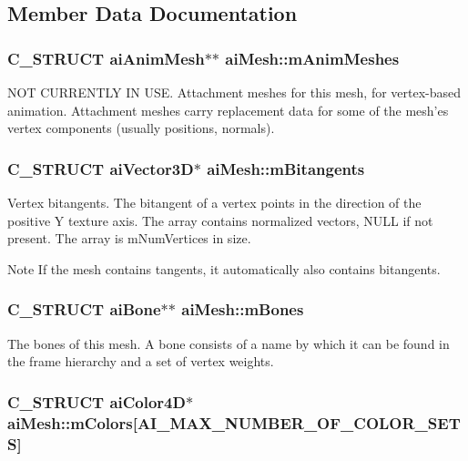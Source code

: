 \subsection{Member Data Documentation}
\hypertarget{structai_mesh_a5078f7db7e99ed05db89dfa412f0e990}{
\subsubsection[{m\-Anim\-Meshes}]{\setlength{\rightskip}{0pt plus 5cm}C\-\_\-\-S\-T\-R\-U\-C\-T {\bf ai\-Anim\-Mesh}$\ast$$\ast$ ai\-Mesh\-::m\-Anim\-Meshes}}\label{structai_mesh_a5078f7db7e99ed05db89dfa412f0e990}
N\-O\-T C\-U\-R\-R\-E\-N\-T\-L\-Y I\-N U\-S\-E. Attachment meshes for this mesh, for vertex-\/based animation. Attachment meshes carry replacement data for some of the mesh'es vertex components (usually positions, normals). \hypertarget{structai_mesh_ab2a81bfe1731f01271ebab274a8f01c4}{
\subsubsection[{m\-Bitangents}]{\setlength{\rightskip}{0pt plus 5cm}C\-\_\-\-S\-T\-R\-U\-C\-T {\bf ai\-Vector3\-D}$\ast$ ai\-Mesh\-::m\-Bitangents}}\label{structai_mesh_ab2a81bfe1731f01271ebab274a8f01c4}
Vertex bitangents. The bitangent of a vertex points in the direction of the positive Y texture axis. The array contains normalized vectors, N\-U\-L\-L if not present. The array is m\-Num\-Vertices in size. \begin{DoxyNote}{Note}
If the mesh contains tangents, it automatically also contains bitangents. 
\end{DoxyNote}
\hypertarget{structai_mesh_a0c0582a7f45b340b6a33552c53232539}{
\subsubsection[{m\-Bones}]{\setlength{\rightskip}{0pt plus 5cm}C\-\_\-\-S\-T\-R\-U\-C\-T {\bf ai\-Bone}$\ast$$\ast$ ai\-Mesh\-::m\-Bones}}\label{structai_mesh_a0c0582a7f45b340b6a33552c53232539}
The bones of this mesh. A bone consists of a name by which it can be found in the frame hierarchy and a set of vertex weights. \hypertarget{structai_mesh_ad9215f67bd0c2277b10775a8adb66b96}{
\subsubsection[{m\-Colors}]{\setlength{\rightskip}{0pt plus 5cm}C\-\_\-\-S\-T\-R\-U\-C\-T {\bf ai\-Color4\-D}$\ast$ ai\-Mesh\-::m\-Colors\mbox{[}{\bf A\-I\-\_\-\-M\-A\-X\-\_\-\-N\-U\-M\-B\-E\-R\-\_\-\-O\-F\-\_\-\-C\-O\-L\-O\-R\-\_\-\-S\-E\-T\-S}\mbox{]}}}\label{structai_mesh_ad9215f67bd0c2277b10775a8adb66b96}
